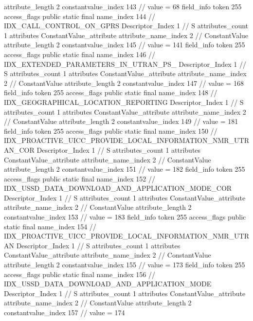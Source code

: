 {{{{{{{					attribute_length	2
					constantvalue_index	143		// value = 68
				}
				}
			}
			field_info {
				token	255
				access_flags	public static final
				name_index	144		// IDX_CALL_CONTROL_ON_GPRS
				Descriptor_Index	1		// S
				attributes_count	1
				attributes {
				ConstantValue_attribute {
					attribute_name_index	2		// ConstantValue
					attribute_length	2
					constantvalue_index	145		// value = 141
				}
				}
			}
			field_info {
				token	255
				access_flags	public static final
				name_index	146		// IDX_EXTENDED_PARAMETERS_IN_UTRAN_PS_
				Descriptor_Index	1		// S
				attributes_count	1
				attributes {
				ConstantValue_attribute {
					attribute_name_index	2		// ConstantValue
					attribute_length	2
					constantvalue_index	147		// value = 168
				}
				}
			}
			field_info {
				token	255
				access_flags	public static final
				name_index	148		// IDX_GEOGRAPHICAL_LOCATION_REPORTING
				Descriptor_Index	1		// S
				attributes_count	1
				attributes {
				ConstantValue_attribute {
					attribute_name_index	2		// ConstantValue
					attribute_length	2
					constantvalue_index	149		// value = 181
				}
				}
			}
			field_info {
				token	255
				access_flags	public static final
				name_index	150		// IDX_PROACTIVE_UICC_PROVIDE_LOCAL_INFORMATION_NMR_UTRAN_COR
				Descriptor_Index	1		// S
				attributes_count	1
				attributes {
				ConstantValue_attribute {
					attribute_name_index	2		// ConstantValue
					attribute_length	2
					constantvalue_index	151		// value = 182
				}
				}
			}
			field_info {
				token	255
				access_flags	public static final
				name_index	152		// IDX_USSD_DATA_DOWNLOAD_AND_APPLICATION_MODE_COR
				Descriptor_Index	1		// S
				attributes_count	1
				attributes {
				ConstantValue_attribute {
					attribute_name_index	2		// ConstantValue
					attribute_length	2
					constantvalue_index	153		// value = 183
				}
				}
			}
			field_info {
				token	255
				access_flags	public static final
				name_index	154		// IDX_PROACTIVE_UICC_PROVIDE_LOCAL_INFORMATION_NMR_UTRAN
				Descriptor_Index	1		// S
				attributes_count	1
				attributes {
				ConstantValue_attribute {
					attribute_name_index	2		// ConstantValue
					attribute_length	2
					constantvalue_index	155		// value = 173
				}
				}
			}
			field_info {
				token	255
				access_flags	public static final
				name_index	156		// IDX_USSD_DATA_DOWNLOAD_AND_APPLICATION_MODE
				Descriptor_Index	1		// S
				attributes_count	1
				attributes {
				ConstantValue_attribute {
					attribute_name_index	2		// ConstantValue
					attribute_length	2
					constantvalue_index	157		// value = 174
}}}}}}}
